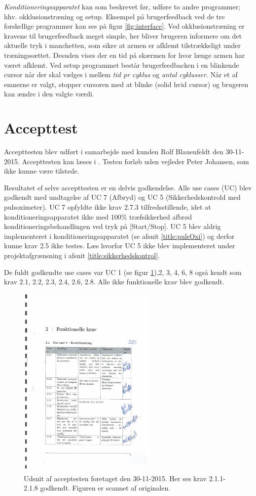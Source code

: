 \textit{Konditioneringsapparatet} kan som beskrevet før, udføre to andre programmer; hhv. okklusionstræning og setup. Eksempel på brugerfeedback ved de tre forskellige programmer kan ses på figur \ref{fig:interface}. Ved okklusionstræning er kravene til brugerfeedback meget simple, her bliver brugeren informere om det aktuelle tryk i manchetten, som sikre at armen er afklemt tilstrækkeligt under træningssættet. Desuden vises der en tid på skærmen for hvor længe armen har været afklemt. Ved setup programmet består brugerfeedbacken i en blinkende cursor når der skal vælges i mellem \textit{tid pr cyklus} og \textit{antal cyklusser}. Når et af emnerne er valgt, stopper cursoren med at blinke (solid hvid cursor) og brugeren kan ændre i den valgte værdi.

\section{Accepttest}
Accepttesten blev udført i samarbejde med kunden Rolf Blauenfeldt den 30-11-2015. Accepttesten kan læses i . Testen forløb uden vejleder Peter Johansen, som ikke kunne være tilstede.

Resultatet ef selve accepttesten er en delvis godkendelse. Alle use cases (UC) blev godkendt med undtagelse af UC 7 (Afbryd) og UC 5 (Sikkerhedskontrold med pulsoximeter). UC 7 opfyldte ikke krav 2.7.3 tilfredsstillende, idet at konditioneringsapparatet ikke med 100\% træfsikkerhed afbrød konditioneringsbehandlingen ved tryk på [Start/Stop]. UC 5 blev aldrig implementeret i konditioneringsapparatet (se afsnit \ref{title:pulsOxi}) og derfor kunne krav 2.5 ikke testes. Læs hvorfor UC 5 ikke blev implementeret under projektafgrænsning i afsnit \ref{title:sikkerhedskontrol}.

De fuldt godkendte use cases var UC 1 (se figur \ref{fig:udsnitAfAccepttest}),2, 3, 4, 6, 8 også kendt som krav 2.1, 2.2, 2.3, 2.4, 2.6, 2.8. Alle ikke funktionelle krav blev godkendt. 

\begin{figure}[H]
	\centering
	\includegraphics[width=0.6\textwidth]{billeder/udsnitAfAccepttest.pdf}
	\caption{Udsnit af acceptesten foretaget den 30-11-2015. Her ses krav 2.1.1-2.1.8 godkendt. Figuren er scannet af originalen.}\label{fig:udsnitAfAccepttest}
\end{figure}